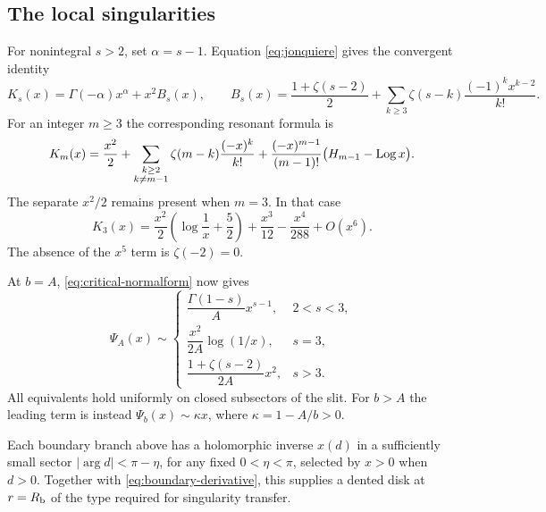 \subsection{The local singularities}

For nonintegral $s>2$, set $\alpha=s-1$.  Equation
\eqref{eq:jonquiere} gives the convergent identity
\begin{equation}\label{eq:K-noninteger}
 K_s(x)=\Gamma(-\alpha)x^\alpha+x^2 B_s(x),\qquad
 B_s(x)=\frac{1+\zeta(s-2)}2+
 \sum_{k\ge3}\zeta(s-k)\frac{(-1)^k x^{k-2}}{k!}.
\end{equation}
For an integer $m\ge3$ the corresponding resonant formula is
\begin{equation}\label{eq:K-integer}
 K_m(x)=\frac{x^2}{2}
 +\sum_{\substack{k\ge2\\k\ne m-1}}
   \zeta(m-k)\frac{(-x)^k}{k!}
 +\frac{(-x)^{m-1}}{(m-1)!}
   \bigl(H_{m-1}-\operatorname{Log} x\bigr).
\end{equation}
The separate $x^2/2$ remains present when $m=3$.
In that case
\begin{equation}\label{eq:K3}
 K_3(x)=\frac{x^2}{2}\left(\log\frac1x+\frac52\right)
       +\frac{x^3}{12}-\frac{x^4}{288}+O(x^6).
\end{equation}
The absence of the $x^5$ term is $\zeta(-2)=0$.

At $b=A$, \eqref{eq:critical-normalform} now gives
\begin{equation}\label{eq:Psi-critical-leading}
 \Psi_A(x)\sim
 \begin{cases}
  \dfrac{\Gamma(1-s)}A x^{s-1},&2<s<3,\\[4pt]
  \dfrac{x^2}{2A}\log(1/x),&s=3,\\[4pt]
  \dfrac{1+\zeta(s-2)}{2A}x^2,&s>3.
 \end{cases}
\end{equation}
All equivalents hold uniformly on closed subsectors of the slit.
For $b>A$ the leading term is instead
$\Psi_b(x)\sim\kappa x$, where $\kappa=1-A/b>0$.

\begin{lemma}\label{lem:delta}
Each boundary branch above has a holomorphic inverse $x(d)$ in a
sufficiently small sector $|\arg d|<\pi-\eta$, for any fixed
$0<\eta<\pi$, selected by $x>0$ when $d>0$.  Together with
\eqref{eq:boundary-derivative}, this supplies a dented disk at
$r=R_{\mathrm b}$ of the type required for singularity transfer.
\end{lemma}

